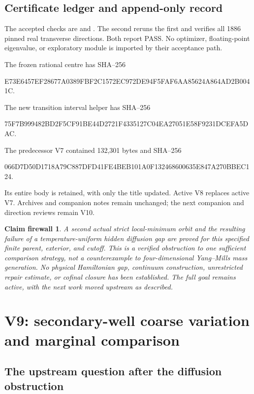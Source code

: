 \documentclass[11pt,oneside]{article}
\newtheorem{firewall}[theorem]{Claim firewall}
\begin{document}
\subsection{Certificate ledger and append-only record}

The accepted checks are
and
.
The second reruns the first and verifies
all 1886 pinned real transverse
directions. Both report PASS. No
optimizer, floating-point eigenvalue,
or exploratory module is imported
by their acceptance path.

The frozen rational centre has SHA--256
\begin{center}\scriptsize\ttfamily
E73E6457EF28677A0389FBF2C1572EC972DE94F5FAF6AA85624A864AD2B0041C.
\end{center}
The new transition interval helper has SHA--256
\begin{center}\scriptsize\ttfamily
75F7B999482BD2F5CF91BE44D2721F4335127C04EA27051E58F9231DCEFA5DAC.
\end{center}
The predecessor V7 contained 132,301 bytes
and SHA--256
\begin{center}\scriptsize\ttfamily
066D7D50D1718A79C887DFD41FE4BEB101A0F132468600635E847A270BBEC124.
\end{center}
Its entire body is retained, with
only the title updated. Active V8
replaces active V7. Archives and
companion notes remain unchanged;
the next companion and direction
reviews remain V10.

\begin{firewall}
A second actual strict local-minimum
orbit and the resulting failure of
a temperature-uniform hidden diffusion
gap are proved for this specified
finite parent, exterior, and cutoff.
This is a verified obstruction to one
sufficient comparison strategy, not
a counterexample to four-dimensional
Yang--Mills mass generation. No
physical Hamiltonian gap, continuum
construction, unrestricted repair
estimate, or cofinal closure has
been established. The full goal
remains active, with the next work
moved upstream as described.
\end{firewall}
\section{V9: secondary-well coarse variation and marginal comparison}
\label{sec:f13v9}

\subsection{The upstream question after the diffusion obstruction}
\end{document}
